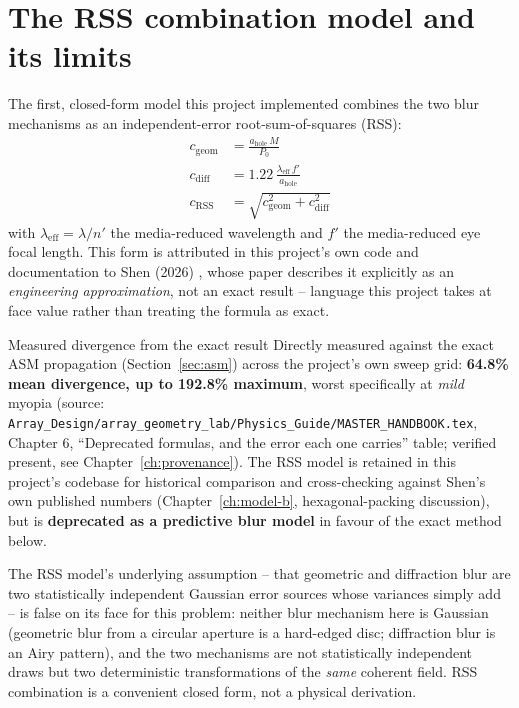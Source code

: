 \section{The RSS combination model and its limits}
\label{sec:rss}
The first, closed-form model this project implemented combines the two blur mechanisms
as an independent-error root-sum-of-squares (RSS):
\begin{align}
c_{\mathrm{geom}} &= \frac{a_{\mathrm{hole}}\, M}{P_0} \\
c_{\mathrm{diff}} &= 1.22\,\frac{\lambda_{\mathrm{eff}}\, f'}{a_{\mathrm{hole}}} \\
c_{\mathrm{RSS}} &= \sqrt{c_{\mathrm{geom}}^2 + c_{\mathrm{diff}}^2}
\end{align}
with $\lambda_{\mathrm{eff}}=\lambda/n'$ the media-reduced wavelength and $f'$ the
media-reduced eye focal length. This form is attributed in this project's own code and
documentation to Shen (2026) \citep{shen2026}, whose paper describes it explicitly as an
\emph{engineering approximation}, not an exact result -- language this project takes at
face value rather than treating the formula as exact.

\begin{warnbox}{Measured divergence from the exact result}
Directly measured against the exact ASM propagation (Section~\ref{sec:asm}) across the
project's own sweep grid: \textbf{64.8\% mean divergence, up to 192.8\% maximum},
worst specifically at \emph{mild} myopia (source:
\texttt{Array\_Design/array\_geometry\_lab/Physics\_Guide/MASTER\_HANDBOOK.tex},
Chapter 6, ``Deprecated formulas, and the error each one carries'' table; verified
present, see Chapter~\ref{ch:provenance}). The RSS model is retained in this project's
codebase for historical comparison and cross-checking against Shen's own published
numbers (Chapter~\ref{ch:model-b}, hexagonal-packing discussion), but is
\textbf{deprecated as a predictive blur model} in favour of the exact method below.
\end{warnbox}

The RSS model's underlying assumption -- that geometric and diffraction blur are two
statistically independent Gaussian error sources whose variances simply add -- is false
on its face for this problem: neither blur mechanism here is Gaussian (geometric blur
from a circular aperture is a hard-edged disc; diffraction blur is an Airy pattern), and
the two mechanisms are not statistically independent draws but two deterministic
transformations of the \emph{same} coherent field. RSS combination is a convenient
closed form, not a physical derivation.

